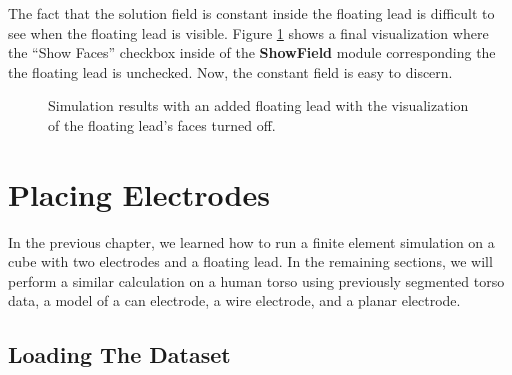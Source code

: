 \documentclass[fleqn,11pt,openany]{book}
\begin{document}
The fact that the solution field is constant inside the floating lead
is difficult to see when the floating lead is visible. Figure
\ref{fig:step_6_results_noface} shows a final visualization where the
``Show Faces'' checkbox inside of the {\bf ShowField} module
corresponding the the floating lead is unchecked. Now, the constant
field is easy to discern.

\begin{figure}
\caption{Simulation results with an added floating lead with the
visualization of the floating lead's faces turned
off.}\label{fig:step_6_results_noface}
\end{figure}

\chapter{Placing Electrodes}

In the previous chapter, we learned how to run a finite element
simulation on a cube with two electrodes and a floating lead. In the
remaining sections, we will perform a similar calculation on a human
torso using previously segmented torso data, a model of a can
electrode, a wire electrode, and a planar electrode.

\section{Loading The Dataset}\label{sec:loading}
\end{document}
